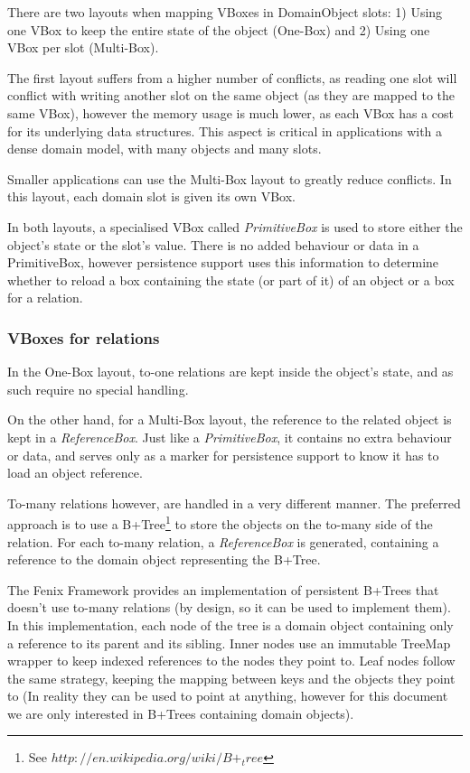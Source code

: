 There are two layouts when mapping VBoxes in DomainObject slots: 1)
Using one VBox to keep the entire state of the object (One-Box) and 2)
Using one VBox per slot (Multi-Box).

The first layout suffers from a higher number of conflicts, as reading
one slot will conflict with writing another slot on the same object
(as they are mapped to the same VBox), however the memory usage is
much lower, as each VBox has a cost for its underlying data
structures. This aspect is critical in applications with a dense
domain model, with many objects and many slots.

Smaller applications can use the Multi-Box layout to greatly reduce
conflicts. In this layout, each domain slot is given its own VBox.

In both layouts, a specialised VBox called {\it PrimitiveBox} is
used to store either the object's state or the slot's value. There is
no added behaviour or data in a PrimitiveBox, however persistence
support uses this information to determine whether to reload a box
containing the state (or part of it) of an object or a box for a relation.

\subsubsection{VBoxes for relations}

In the One-Box layout, to-one relations are kept inside the object's
state, and as such require no special handling. 

On the other hand, for a Multi-Box layout, the reference to the
related object is kept in a {\it ReferenceBox}. Just like a {\it
  PrimitiveBox}, it contains no extra behaviour or data, and serves
only as a marker for persistence support to know it has to load an
object reference.

To-many relations however, are handled in a very different manner. The
preferred approach is to use a B+Tree\footnote{See
  $http://en.wikipedia.org/wiki/B+_tree$} to store the objects on the
to-many side of the relation. For each to-many relation, a {\it
  ReferenceBox} is generated, containing a reference to the domain
object representing the B+Tree.

The Fenix Framework provides an implementation of persistent B+Trees
that doesn't use to-many relations (by design, so it can be used to
implement them). In this implementation, each node of the tree is a
domain object containing only a reference to its parent and its
sibling. Inner nodes use an immutable TreeMap wrapper to keep indexed
references to the nodes they point to. Leaf nodes follow the same
strategy, keeping the mapping between keys and the objects they point
to (In reality they can be used to point at anything, however for this
document we are only interested in B+Trees containing domain objects).

